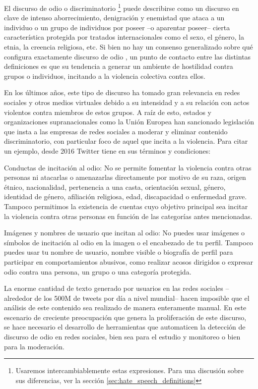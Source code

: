 
El discurso de odio o discriminatorio \footnote{Usaremos intercambiablemente estas expresiones. Para una discusión sobre sus diferencias, ver la sección \ref{sec:hate_speech_definitions}} puede describirse como un discurso en clave de intenso aborrecimiento, denigración y enemistad que ataca a un individuo o un grupo de individuos por poseer --o aparentar poseer-- cierta característica protegida por tratados internacionales como el sexo, el género, la etnia, la creencia religiosa, etc. Si bien no hay un consenso generalizado sobre qué configura exactamente discurso de odio \cite{article192015}, un punto de contacto entre las distintas definiciones es que su tendencia a generar un ambiente de hostilidad contra grupos o individuos, incitando a la violencia colectiva contra ellos.

En los últimos años, este tipo de discurso ha tomado gran relevancia en redes sociales y otros medios virtuales debido a su intensidad y a su relación con actos violentos contra miembros de estos grupos. A raíz de esto, estados y organizaciones supranacionales como la Unión Europea han sancionado legislación que insta a las empresas de redes sociales a moderar y eliminar contenido discriminatorio, con particular foco de aquel que incita a la violencia. Para citar un ejemplo, desde 2016 Twitter tiene en sus términos y condiciones:

\begin{displayquote}
    Conductas de incitación al odio: No se permite fomentar la violencia contra otras personas ni atacarlas o amenazarlas directamente por motivo de su raza, origen étnico, nacionalidad, pertenencia a una casta, orientación sexual, género, identidad de género, afiliación religiosa, edad, discapacidad o enfermedad grave. Tampoco permitimos la existencia de cuentas cuyo objetivo principal sea incitar la violencia contra otras personas en función de las categorías antes mencionadas.

    Imágenes y nombres de usuario que incitan al odio: No puedes usar imágenes o símbolos de incitación al odio en la imagen o el encabezado de tu perfil. Tampoco puedes usar tu nombre de usuario, nombre visible o biografía de perfil para participar en comportamientos abusivos, como realizar acosos dirigidos o expresar odio contra una persona, un grupo o una categoría protegida.
\end{displayquote}

La enorme cantidad de texto generado por usuarios en las redes sociales --alrededor de los 500M de tweets por día a nivel mundial-- hacen imposible que el análisis de este contenido sea realizado de manera enteramente manual. En este escenario de creciente preocupación que genera la proliferación de este discurso, se hace necesario el desarrollo de herramientas que automaticen la detección de discurso de odio en redes sociales, bien sea para el estudio y monitoreo o bien para la moderación.

